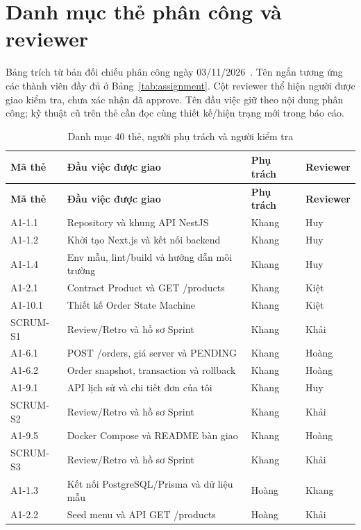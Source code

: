 \section{Danh mục thẻ phân công và reviewer}
\label{sec:task-assignment}
Bảng trích từ bản đối chiếu phân công ngày 03/11/2026~\cite{assignment}.
Tên ngắn tương ứng các thành viên đầy đủ ở Bảng~\ref{tab:assignment}.
Cột reviewer thể hiện người được giao kiểm tra, chưa xác nhận đã approve.
Tên đầu việc giữ theo nội dung phân công; kỹ thuật cũ trên thẻ cần đọc
cùng thiết kế/hiện trạng mới trong báo cáo.

{\footnotesize{}
\begin{longtable}{@{}L{0.15\textwidth}L{0.50\textwidth}L{0.12\textwidth}L{0.13\textwidth}@{}}
\caption{Danh mục 40 thẻ, người phụ trách và người kiểm tra}\label{tab:task-assignment}\\
\toprule\textbf{Mã thẻ} & \textbf{Đầu việc được giao} & \textbf{Phụ trách} & \textbf{Reviewer} \\\midrule\endfirsthead
\toprule\textbf{Mã thẻ} & \textbf{Đầu việc được giao} & \textbf{Phụ trách} & \textbf{Reviewer} \\\midrule\endhead
\bottomrule\endfoot
A1-1.1 & Repository và khung API NestJS & Khang & Huy \\
A1-1.2 & Khởi tạo Next.js và kết nối backend & Khang & Huy \\
A1-1.4 & Env mẫu, lint/build và hướng dẫn môi trường & Khang & Huy \\
A1-2.1 & Contract Product và GET /products & Khang & Kiệt \\
A1-10.1 & Thiết kế Order State Machine & Khang & Kiệt \\
SCRUM-S1 & Review/Retro và hồ sơ Sprint & Khang & Khải \\
A1-6.1 & POST /orders, giá server và PENDING & Khang & Hoàng \\
A1-6.2 & Order snapshot, transaction và rollback & Khang & Hoàng \\
A1-9.1 & API lịch sử và chi tiết đơn của tôi & Khang & Huy \\
SCRUM-S2 & Review/Retro và hồ sơ Sprint & Khang & Khải \\
A1-9.5 & Docker Compose và README bàn giao & Khang & Hoàng \\
SCRUM-S3 & Review/Retro và hồ sơ Sprint & Khang & Khải \\
A1-1.3 & Kết nối PostgreSQL/Prisma và dữ liệu mẫu & Hoàng & Khang \\
A1-2.2 & Seed menu và API GET /products & Hoàng & Khải \\

\end{longtable}}

